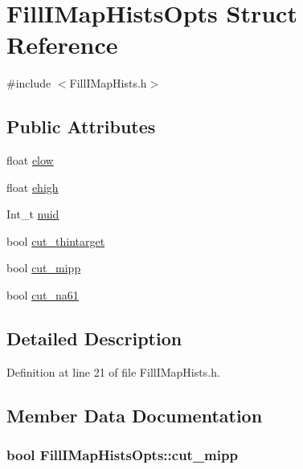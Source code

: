 \hypertarget{struct_fill_i_map_hists_opts}{\section{Fill\-I\-Map\-Hists\-Opts Struct Reference}
\label{struct_fill_i_map_hists_opts}
}


{\ttfamily \#include $<$Fill\-I\-Map\-Hists.\-h$>$}

\subsection*{Public Attributes}
\begin{DoxyCompactItemize}
\item 
float \hyperlink{struct_fill_i_map_hists_opts_aedcac42eb1b9095b1fbd1e3dbf9192a8}{elow}
\item 
float \hyperlink{struct_fill_i_map_hists_opts_a8686a1f088c28200c625677dbf76923b}{ehigh}
\item 
Int\-\_\-t \hyperlink{struct_fill_i_map_hists_opts_a92318ccda191568649f09f2220dd8371}{nuid}
\item 
bool \hyperlink{struct_fill_i_map_hists_opts_a8824fb5df1a05cd23d9ea2bd99c48aab}{cut\-\_\-thintarget}
\item 
bool \hyperlink{struct_fill_i_map_hists_opts_a2262303bedb8bdfe1de984abdd841911}{cut\-\_\-mipp}
\item 
bool \hyperlink{struct_fill_i_map_hists_opts_a329f41d35300df826b6e5175999292c7}{cut\-\_\-na61}
\end{DoxyCompactItemize}


\subsection{Detailed Description}


Definition at line 21 of file Fill\-I\-Map\-Hists.\-h.



\subsection{Member Data Documentation}
\hypertarget{struct_fill_i_map_hists_opts_a2262303bedb8bdfe1de984abdd841911}{
\subsubsection[{cut\-\_\-mipp}]{\setlength{\rightskip}{0pt plus 5cm}bool Fill\-I\-Map\-Hists\-Opts\-::cut\-\_\-mipp}}\label{struct_fill_i_map_hists_opts_a2262303bedb8bdfe1de984abdd841911}


